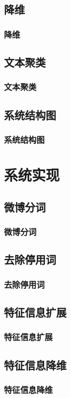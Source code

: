 \documentclass[CJK, table]{beamer}
\begin{document}
\begin{CJK}{UTF8}{gbsn}
\subsection{降维}
\begin{frame}
  \frametitle{降维}
\end{frame}

\subsection{文本聚类}
\begin{frame}
  \frametitle{文本聚类}
\end{frame}

\subsection{系统结构图}
\begin{frame}
  \frametitle{系统结构图}
\end{frame}

\section{系统实现}

\subsection{微博分词}
\begin{frame}
  \frametitle{微博分词}
\end{frame}

\subsection{去除停用词}
\begin{frame}
  \frametitle{去除停用词}
\end{frame}

\subsection{特征信息扩展}
\begin{frame}
  \frametitle{特征信息扩展}
\end{frame}

\subsection{特征信息降维}
\begin{frame}
  \frametitle{特征信息降维}
\end{frame}


\end{CJK}
\end{document}
